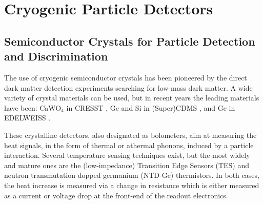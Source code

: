 


\section{Cryogenic Particle Detectors}

\subsection{Semiconductor Crystals for Particle Detection and Discrimination}

The use of cryogenic semiconductor crystals has been pioneered by the direct dark matter  detection experiments searching for low-mass dark matter. 
A wide variety of crystal materials can be used, but in recent years the leading materials have been: CaWO$_4$ in CRESST
, Ge and Si in (Super)CDMS
, and Ge in EDELWEISS
.

These crystalline detectors, also designated as bolometers, aim at measuring the heat signals, in the form of thermal or athermal phonons, induced by a particle interaction.
Several temperature sensing techniques exist, but the most widely and mature ones are the (low-impedance) Transition Edge Sensors (TES) and neutron transmutation dopped germanium (NTD-Ge) thermistors. In both cases, the heat increase is measured via a change in resistance which is either measured as a current or voltage drop at the front-end of the readout electronics.

